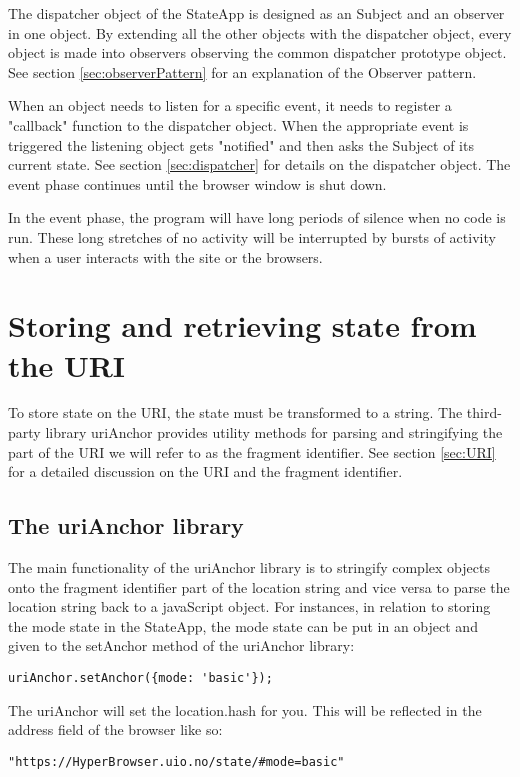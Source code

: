 \documentclass[english]{ifimaster}
\begin{document}
The dispatcher object of the StateApp is designed as an Subject and an observer in one object. By extending all the other objects with the dispatcher object, every object is made into observers observing the common dispatcher prototype object. See section \ref{sec:observerPattern} for an explanation of the Observer pattern.


When an object needs to listen for a specific event, it needs to register a "callback" function to the dispatcher object. When the appropriate event is triggered the listening object gets "notified" and then asks the Subject of its current state. See section \ref{sec:dispatcher} for details on the dispatcher object. The event phase continues until the browser window is shut down. %

In the event phase, the program will have long periods of silence when no code is run. These long stretches of no activity will be interrupted by bursts of activity when a user interacts with the site or the browsers.


\section{Storing and retrieving state from the URI}
To store state on the URI, the state must be transformed to a string. The third-party library uriAnchor provides utility methods for parsing and stringifying the part of the URI we will refer to as the fragment identifier. See section \ref{sec:URI} for a detailed discussion on the URI and the fragment identifier. 

\subsection{The uriAnchor library}
\label{sec:uriAnchor}
The main functionality of the uriAnchor library is to stringify complex 
objects onto the fragment identifier part of the location string and vice versa to parse the location string back to a javaScript object. For instances, in relation to storing the mode state in the StateApp, the mode state can be put in an object and given to the setAnchor method of the uriAnchor library:

\begin{lstlisting}[caption=Setting the location with the Uri Anchor library.]
  uriAnchor.setAnchor({mode: 'basic'}); 
\end{lstlisting}


The uriAnchor will set the location.hash for you. This will be reflected in the address field of the browser like so: 
\begin{lstlisting}[caption=The browsers address field after using the setAnchor method of the uriAnchor library.]
  "https://HyperBrowser.uio.no/state/#mode=basic"
\end{lstlisting}
\end{document}
